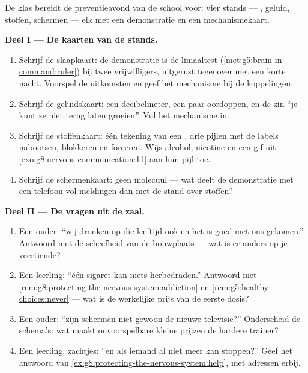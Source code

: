 \begin{problem}\label{pb:g8:protecting-the-nervous-system:1}
De klas bereidt de preventieavond van de school voor: vier stands ---
, geluid, stoffen, schermen --- elk met een demonstratie en een
mechanismekaart.

\medskip\noindent\textbf{Deel I --- De kaarten van de
stands.}
\begin{enumerate}
  \item Schrijf de slaapkaart: de demonstratie is de liniaaltest
        (\cref{met:g5:brain-in-command:ruler}) bij twee vrijwilligers,
        uitgerust tegenover met een korte nacht. Voorspel de uitkomsten en
        geef het mechanisme bij de koppelingen.
  \item Schrijf de geluidskaart: een decibelmeter, een paar oordoppen, en
        de zin ``je kunt ze niet terug laten groeien''. Vul het mechanisme
        in.
  \item Schrijf de stoffenkaart: één tekening van een , drie pijlen
        met de labels nabootsen, blokkeren en forceren. Wijs alcohol,
        nicotine en een gif uit
        \cref{exo:g8:nervous-communication:11} aan hun pijl toe.
  \item Schrijf de schermenkaart: geen molecuul --- wat deelt de
        demonstratie met een telefoon vol meldingen dan met de stand over
        stoffen?
\end{enumerate}

\medskip\noindent\textbf{Deel II --- De vragen uit de
zaal.}
\begin{enumerate}[resume]
  \item Een ouder: ``wij dronken op die leeftijd ook en het is goed met
        ons gekomen.'' Antwoord met de scheefheid van de bouwplaats ---
        wat is er anders op je veertiende?
  \item Een leerling: ``één sigaret kan niets herbedraden.'' Antwoord met
        \cref{rem:g8:protecting-the-nervous-system:addiction} en
        \cref{rem:g5:healthy-choices:never} --- wat is de werkelijke prijs
        van de eerste dosis?
  \item Een ouder: ``zijn schermen niet gewoon de nieuwe televisie?''
        Onderscheid de schema's: wat maakt onvoorspelbare kleine prijzen
        de hardere trainer?
  \item Een leerling, zachtjes: ``en als iemand al niet meer kan
        stoppen?'' Geef het antwoord van
        \cref{ex:g8:protecting-the-nervous-system:help}, met adressen erbij.
\end{enumerate}


\end{problem}
